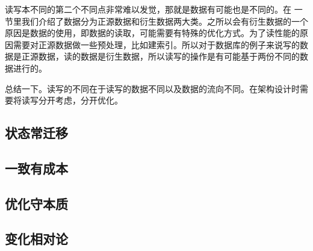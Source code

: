 读写本不同的第二个不同点非常难以发觉，那就是数据有可能也是不同的。在 一节里我们介绍了数据分为正源数据和衍生数据两大类。之所以会有衍生数据的一个原因是数据的使用，即数据的读取，可能需要有特殊的优化方式。为了读性能的原因需要对正源数据做一些预处理，比如建索引。所以对于数据库的例子来说写的数据是正源数据，读的数据是衍生数据，所以读写的操作是有可能基于两份不同的数据进行的。


总结一下。读写的不同在于读写的数据不同以及数据的流向不同。在架构设计时需要将读写分开考虑，分开优化。



\subsection{状态常迁移}

\subsection{一致有成本}

\subsection{优化守本质}


\subsection{变化相对论}

